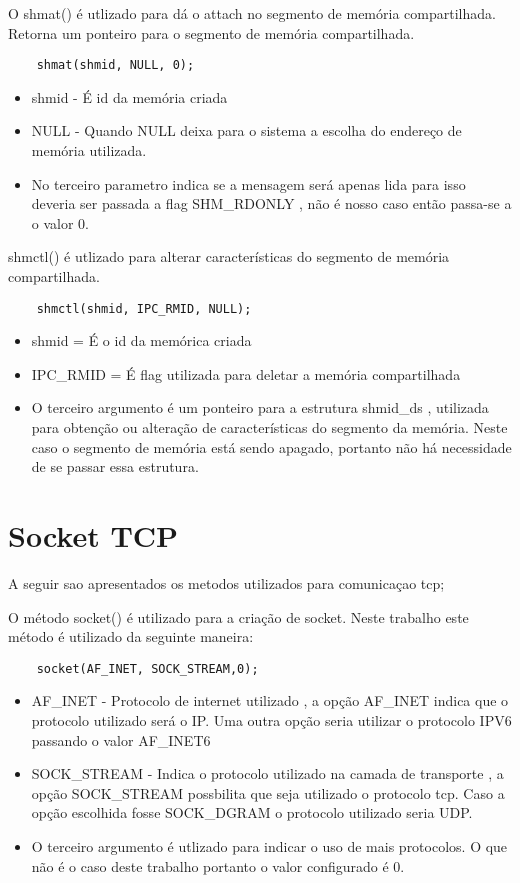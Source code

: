 O shmat() é utlizado para dá o attach no segmento de memória compartilhada. Retorna um ponteiro para o segmento de memória compartilhada.
\begin{lstlisting}
	shmat(shmid, NULL, 0);
\end{lstlisting}

\begin{itemize}
\item shmid - É  id da memória criada 
\item NULL - Quando NULL deixa para o sistema a escolha do endereço de memória utilizada.
\item No terceiro parametro indica se a mensagem será apenas lida para isso deveria ser passada a flag  SHM\_RDONLY , não é nosso caso então passa-se a o valor 0.
\end{itemize}

shmctl() é utlizado para alterar características do segmento de memória compartilhada.
\begin{lstlisting}
	shmctl(shmid, IPC_RMID, NULL);
\end{lstlisting}  	

\begin{itemize}
	\item shmid = É o id da memórica criada
	\item IPC\_RMID = É flag utilizada para deletar a memória compartilhada
	\item O terceiro argumento é um ponteiro para a estrutura shmid\_ds , utilizada para obtenção ou alteração de características do segmento da memória. Neste caso o segmento de memória está sendo apagado, portanto não há necessidade de se passar essa estrutura.
\end{itemize}

\section{Socket TCP}
A seguir sao apresentados os metodos utilizados para comunicaçao tcp;

O método socket() é utilizado para a criação de socket. Neste trabalho este método é utilizado da seguinte maneira:
\begin{lstlisting}
	socket(AF_INET, SOCK_STREAM,0);
\end{lstlisting}

\begin{itemize}
	\item AF\_INET - Protocolo de internet utilizado , a opção AF\_INET indica que o protocolo utilizado será o IP. Uma outra opção seria utilizar o protocolo IPV6 passando o valor AF\_INET6
	\item SOCK\_STREAM - Indica o protocolo utilizado na camada de transporte , a opção SOCK\_STREAM possbilita que seja utilizado o protocolo tcp. Caso a opção escolhida fosse SOCK\_DGRAM o protocolo utilizado seria UDP.
	\item O terceiro argumento é utlizado para indicar o uso de mais protocolos. O que não é o caso deste trabalho portanto o valor configurado é 0.
\end{itemize}


